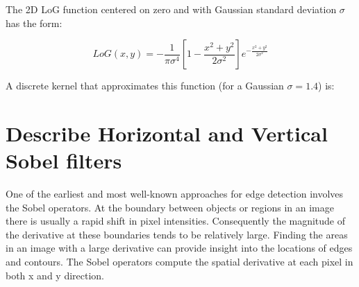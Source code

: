 \documentclass{article}
\begin{document}
The 2D LoG function centered on zero and with Gaussian standard deviation $\sigma$ has the form:

\begin{equation*}
    LoG(x,y) = -\frac{1}{\pi\sigma^4}[1 - \frac{x^2 + y^2}{2\sigma^2}]e^{-\frac{x^2 + y^2}{2\sigma^2}}
\end{equation*}

A discrete kernel that approximates this function (for a Gaussian $\sigma = 1.4$) is:

\def\pixelmap{{%
{0, 1, 1, 2, 2, 2, 1, 1, 0},
{1, 2, 4, 5, 5, 5, 4, 2, 1},
{1, 4, 5, 3, 0, 3, 5, 4, 1},
{2, 5, 3, -12, -24, -12, 3, 5, 2},
{2, 5, 0, -24, -40, -24, 0, 5, 2},
{2, 5, 3, -12, -24, -12, 3, 5, 2},
{1, 4, 5, 3, 0, 3, 5, 4, 1},
{1, 2, 4, 5, 5, 5, 4, 2, 1},
{0, 1, 1, 2, 2, 2, 1, 1, 0}
}}

\begin{center}
\end{center}

\newpage

\section{Describe Horizontal and Vertical Sobel filters}

One of the earliest and most well-known approaches for edge detection involves the Sobel operators. At the boundary between objects or regions in an image there is usually a rapid shift in pixel intensities. Consequently the magnitude of the derivative at these boundaries tends to be relatively large. Finding the areas in an image with a large derivative can provide insight into the locations of edges and contours. The Sobel operators compute the spatial derivative at each pixel in both x and y direction.
\end{document}
